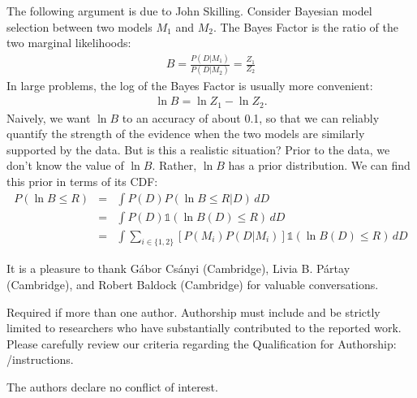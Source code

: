 \documentclass[journal,article,accept,moreauthors,pdftex,12pt,a4paper]{mdpi}
\begin{document}
The following argument is due to John Skilling. Consider Bayesian model selection
between two models $M_1$ and $M_2$. The Bayes Factor is the ratio of the
two marginal likelihoods:
\begin{eqnarray}
B = \frac{P(D | M_1)}{P(D | M_2)} = \frac{Z_1}{Z_2}
\end{eqnarray}
In large problems, the log of the Bayes Factor is usually more convenient:
\begin{eqnarray}
\ln B = \ln Z_1 - \ln Z_2.
\end{eqnarray}
Naively, we want $\ln B$ to an accuracy of about 0.1, so that we can reliably
quantify the strength of the evidence when the two models are similarly
supported by the data. But is this a realistic situation?
Prior to the data, we don't know the
value of $\ln B$. Rather, $\ln B$ has a prior distribution. We can find this
prior in terms of its CDF:
\begin{eqnarray}
P(\ln B \leq R) &=& \int P(D)P(\ln B \leq R | D) \, dD\\
&=& \int P(D) \mathds{1}\left(\ln B(D) \leq R\right) \, dD\\
&=& \int \sum_{i\in\{1,2\}}\left[P(M_i)P(D|M_i)\right] \mathds{1}\left(\ln B(D) \leq R\right) \, dD
\end{eqnarray}





It is a pleasure to thank Gábor Csányi (Cambridge), Livia B. Pártay (Cambridge),
and Robert Baldock (Cambridge) for valuable conversations.



Required if more than one author. Authorship must include and be strictly limited to researchers who have substantially contributed to the reported work. Please carefully review our criteria regarding the Qualification for Authorship: \web /instructions.


The authors declare no conflict of interest.
\end{document}
